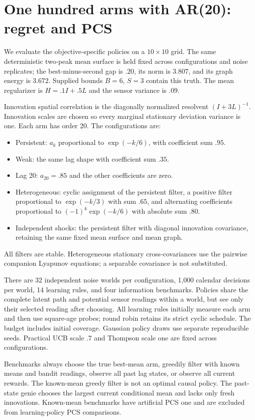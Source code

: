 \section{One hundred arms with AR(20): regret and PCS}
We evaluate the objective-specific policies on a $10\times10$ grid. The same deterministic two-peak mean surface is held fixed across configurations and noise replicates; the best-minus-second gap is $.20$, its norm is $3.807$, and its graph energy is $3.672$. Supplied bounds $B=6$, $S=3$ contain this truth. The mean regularizer is $H=.1I+.5L$ and the sensor variance is $.09$.

Innovation spatial correlation is the diagonally normalized resolvent $(I+3L)^{-1}$. Innovation scales are chosen so every marginal stationary deviation variance is one. Each arm has order 20. The configurations are:
\begin{itemize}
\item Persistent: $a_k$ proportional to $\exp(-k/6)$, with coefficient sum $.95$.
\item Weak: the same lag shape with coefficient sum $.35$.
\item Lag 20: $a_{20}=.85$ and the other coefficients are zero.
\item Heterogeneous: cyclic assignment of the persistent filter, a positive filter proportional to $\exp(-k/3)$ with sum $.65$, and alternating coefficients proportional to $(-1)^k\exp(-k/6)$ with absolute sum $.80$.
\item Independent shocks: the persistent filter with diagonal innovation covariance, retaining the same fixed mean surface and mean graph.
\end{itemize}
All filters are stable. Heterogeneous stationary cross-covariances use the pairwise companion Lyapunov equations; a separable covariance is not substituted.

There are 32 independent noise worlds per configuration, 1,000 calendar decisions per world, 14 learning rules, and four information benchmarks. Policies share the complete latent path and potential sensor readings within a world, but see only their selected reading after choosing. All learning rules initially measure each arm and then use square-age probes; round robin retains its strict cyclic schedule. The budget includes initial coverage. Gaussian policy draws use separate reproducible seeds. Practical UCB scale $.7$ and Thompson scale one are fixed across configurations.

Benchmarks always choose the true best-mean arm, greedily filter with known means and bandit readings, observe all past lag states, or observe all current rewards. The known-mean greedy filter is not an optimal causal policy. The past-state genie chooses the largest current conditional mean and lacks only fresh innovations. Known-mean benchmarks have artificial PCS one and are excluded from learning-policy PCS comparisons.

